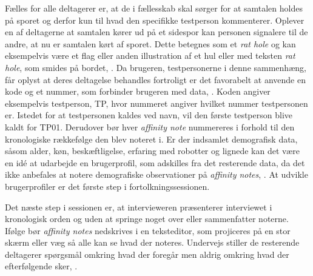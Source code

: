 Fælles for alle deltagerer er, at de i fællesskab skal sørger for at samtalen holdes på sporet og derfor kun til hvad den specifikke testperson kommenterer. Oplever en af deltagerne at samtalen kører ud på et sidespor kan personen signalere til de andre, at nu er samtalen kørt af sporet. Dette betegnes som et \textit{rat hole} og kan eksempelvis være et flag eller anden illustration af et hul eller med teksten \textit{rat hole}, som smides på bordet, \parencite[s. 109]{Book:CIInterpretationSession}.\blankline
%   
Da brugeren, testpersonerne i denne sammenhæng, får oplyst at deres deltagelse behandles fortroligt  er det favorabelt at anvende en kode og et nummer, som forbinder brugeren med data, \parencite[s. 111]{Book:CIInterpretationSession}. Koden angiver eksempelvis testperson, TP, hvor nummeret angiver hvilket nummer testpersonen er. Istedet for at testpersonen kaldes ved navn, vil den første testperson blive kaldt for TP01. Derudover bør hver \textit{affinity note} nummereres i forhold til den kronologiske rækkefølge den blev noteret i. Er der indsamlet demografisk data, såsom alder, køn, beskæftligelse, erfaring med robotter og lignede kan det være en idé at udarbejde en brugerprofil, som adskilles fra det resterende data, da det ikke anbefales at notere demografiske observationer på \textit{affinity notes}, \parencite[s. 109]{Book:CIInterpretationSession}. At udvikle brugerprofiler er det første step i fortolkningssessionen. 

Det næste step i sessionen er, at intervieweren præsenterer interviewet i kronologisk orden og uden at springe noget over eller sammenfatter noterne. Ifølge \textcite[s. 113]{Book:CIInterpretationSession} bør \textit{affinity notes} nedskrives i en teksteditor, som projiceres på en stor skærm eller væg så alle kan se hvad der noteres. Undervejs stiller de resterende deltagerer spørgsmål omkring hvad der foregår men aldrig omkring hvad der efterfølgende sker, \parencite[s. 114]{Book:CIInterpretationSession}.

